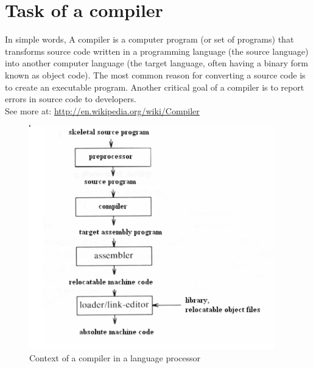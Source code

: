\documentclass[12pt, a4paper]{report}
\begin{document}
		\section{Task of a compiler}
			\tab In simple words, A compiler is a computer program (or set of programs) that transforms source code written in a programming language (the source language) into another computer language (the target language, often having a binary form known as object code). The most common reason for converting a source code is to create an executable program. Another critical goal of a compiler is to report errors in source code to developers.\\
			\tab See more at: \url{http://en.wikipedia.org/wiki/Compiler}
			\begin{figure}[h]
				\centering
				\includegraphics[width=0.95\textwidth]{compilerinLangproc.png}
				\caption{Context of a compiler in a language processor}
				\label{fig:inContext}
			\end{figure}
\end{document}
